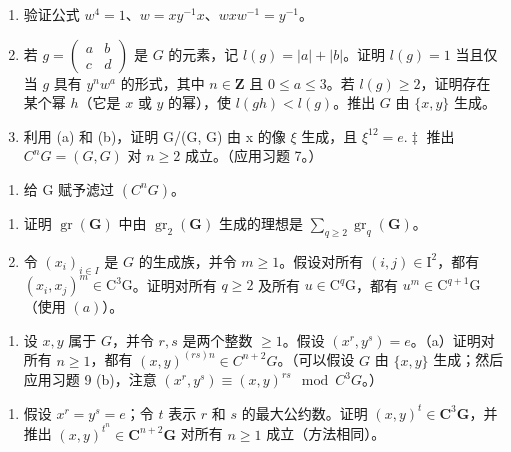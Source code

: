 \begin{enumerate}
\def\labelenumi{(\alph{enumi})}
\item
  验证公式 \(w^4 = 1\)、\(w = xy^{-1}x\)、\(wxw^{-1} = y^{-1}\)。
\item
  若 \(g = \begin{pmatrix} a & b \\ c & d \end{pmatrix}\) 是 \(G\) 的元素，记 \(l(g) = |a| + |b|\)。证明 \(l(g) = 1\) 当且仅当 \(g\) 具有 \(y^n w^a\) 的形式，其中 \(n \in \mathbf{Z}\) 且 \(0 \leqslant a \leqslant 3\)。若 \(l(g) \geqslant 2\)，证明存在某个幂 \(h\)（它是 \(x\) 或 \(y\) 的幂），使 \(l(gh) < l(g)\)。推出 \(G\) 由 \(\{x, y\}\) 生成。
\item
  利用 (a) 和 (b)，证明 G/(G, G) 由 x 的像 \(\xi\) 生成，且 \(\xi^{12} = e.\ddagger\) 推出 \(C^{n}G = (G, G)\) 对 \(n \geqslant 2\) 成立。（应用习题 7。）
\end{enumerate}

\begin{enumerate}
\def\labelenumi{\arabic{enumi}.}
\setcounter{enumi}{8}
\tightlist
\item
  给 G 赋予滤过 \((C^{n}G)\)。
\end{enumerate}

\begin{enumerate}
\def\labelenumi{(\alph{enumi})}
\item
  证明 \(\operatorname{gr}(\mathbf{G})\) 中由 \(\operatorname{gr}_2(\mathbf{G})\) 生成的理想是 \(\sum_{q\geqslant 2}\operatorname{gr}_q(\mathbf{G})\)。
\item
  令 \((x_{i})_{i\in I}\) 是 \(G\) 的生成族，并令 \(m\geqslant 1\)。假设对所有 \((i,j)\in \mathrm{I}^2\)，都有 \((x_i,x_j)^m\in \mathrm{C}^3\mathrm{G}\)。证明对所有 \(q\geqslant 2\) 及所有 \(u\in \mathrm{C}^q\mathrm{G}\)，都有 \(u^{m}\in \mathrm{C}^{q + 1}\mathrm{G}\)（使用 \((a)\)）。
\end{enumerate}

\begin{enumerate}
\def\labelenumi{\arabic{enumi}.}
\setcounter{enumi}{9}
\tightlist
\item
  设 \(x, y\) 属于 \(G\)，并令 \(r, s\) 是两个整数 \(\geqslant 1\)。假设 \((x^r, y^s) = e\)。（a）证明对所有 \(n \geqslant 1\)，都有 \((x, y)^{(rs)n} \in C^{n+2}G\)。（可以假设 \(G\) 由 \(\{x, y\}\) 生成；然后应用习题 9 (b)，注意 \((x^r, y^s) \equiv (x, y)^{rs} \mod C^3G\)。）
\end{enumerate}

\begin{enumerate}
\def\labelenumi{(\alph{enumi})}
\setcounter{enumi}{1}
\tightlist
\item
  假设 \(x^r = y^s = e\)；令 \(t\) 表示 \(r\) 和 \(s\) 的最大公约数。证明 \((x, y)^t \in \mathbf{C}^3\mathbf{G}\)，并推出 \((x, y)^{t^n} \in \mathbf{C}^{n+2}\mathbf{G}\) 对所有 \(n \geqslant 1\) 成立（方法相同）。
\end{enumerate}

